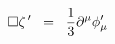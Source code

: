 \begin{equation}
\square \zeta^{\,\prime}  \;\; =\;\; {1 \over 3} \partial^{\mu} \phi^{\prime}_{\mu}
\label{eq:b8}
\end{equation}

